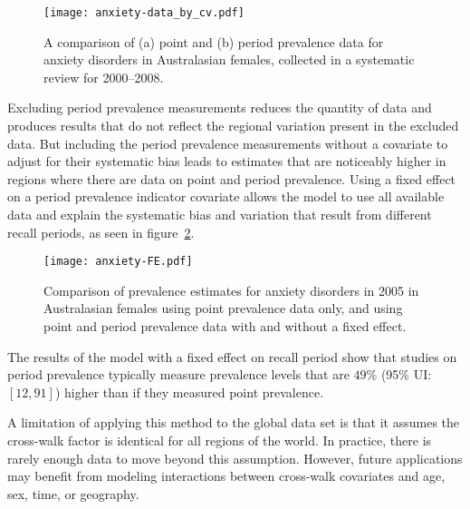     \begin{figure}[h]
        \begin{center}
            \texttt{[image: anxiety-data\_by\_cv.pdf]}
            \caption[Systematic review data of anxiety disorders.]{A comparison of (a) point and (b) period prevalence data
              for anxiety disorders in Australasian females, collected in a systematic review for
              2000--2008.}
            \label{fig:app-anxiety data}
        \end{center}
    \end{figure}

Excluding period prevalence measurements reduces the quantity of data
and produces results that do not reflect the regional variation
present in the excluded data.  But including the period prevalence
measurements without a covariate to adjust for their systematic bias
leads to estimates that are noticeably higher in regions where there
are data on point and period prevalence.  Using a fixed effect on a
period prevalence indicator covariate allows the model to use all
available data and explain the systematic bias and variation that
result from different recall periods, as seen in
figure~\ref{fig:app-anxiety FE}.

    \begin{figure}[h]
        \begin{center}
            \texttt{[image: anxiety-FE.pdf]}
            \caption[Comparison of prevalence estimates of anxiety disorders 
              using different methods.]{Comparison of prevalence estimates for anxiety
              disorders in 2005 in Australasian females using point
              prevalence data only, and using point and period prevalence data
              with and without a fixed effect.}
            \label{fig:app-anxiety FE}
        \end{center}
    \end{figure}

The results of the model with a fixed effect on recall period show
that studies on period prevalence typically measure prevalence levels
that are $49$\% (95\% UI: $[12, 91]$) higher than if they measured point
prevalence.

A limitation of applying this method to the global data set is that it
assumes the cross-walk factor is identical for all regions of the
world.  In practice, there is rarely enough data to move beyond this
assumption.  However, future applications may benefit from modeling
interactions between cross-walk covariates and age, sex, time, or
geography.
